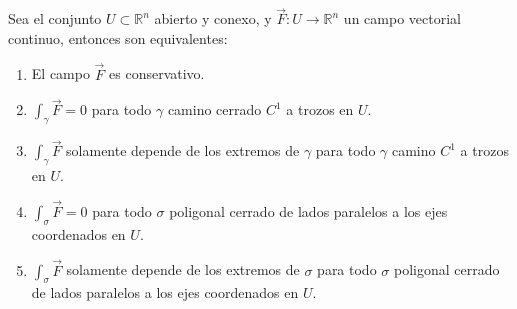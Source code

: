 \begin{teorema} 
    Sea el conjunto $U \subset \mathbb{R}^n$ abierto y conexo, y $\vec{F}: U \to \mathbb{R}^n$ un campo vectorial continuo, entonces son equivalentes:
    \begin{enumerate}
        \item El campo $\vec{F}$ es conservativo.
        \item $\int_{\gamma} \vec{F} = 0$ para todo $\gamma$ camino cerrado $C^1$ a trozos en $U$.
        \item $\int_{\gamma} \vec{F}$ solamente depende de los extremos de $\gamma$ para todo $\gamma$ camino $C^1$ a trozos en $U$.
        \item $\int_{\sigma} \vec{F} = 0$ para todo $\sigma$ poligonal cerrado de lados paralelos a los ejes coordenados en $U$.
        \item $\int_{\sigma} \vec{F}$ solamente depende de los extremos de $\sigma$ para todo $\sigma$ poligonal cerrado de lados paralelos a los ejes coordenados en $U$.
    \end{enumerate}

\end{teorema}

